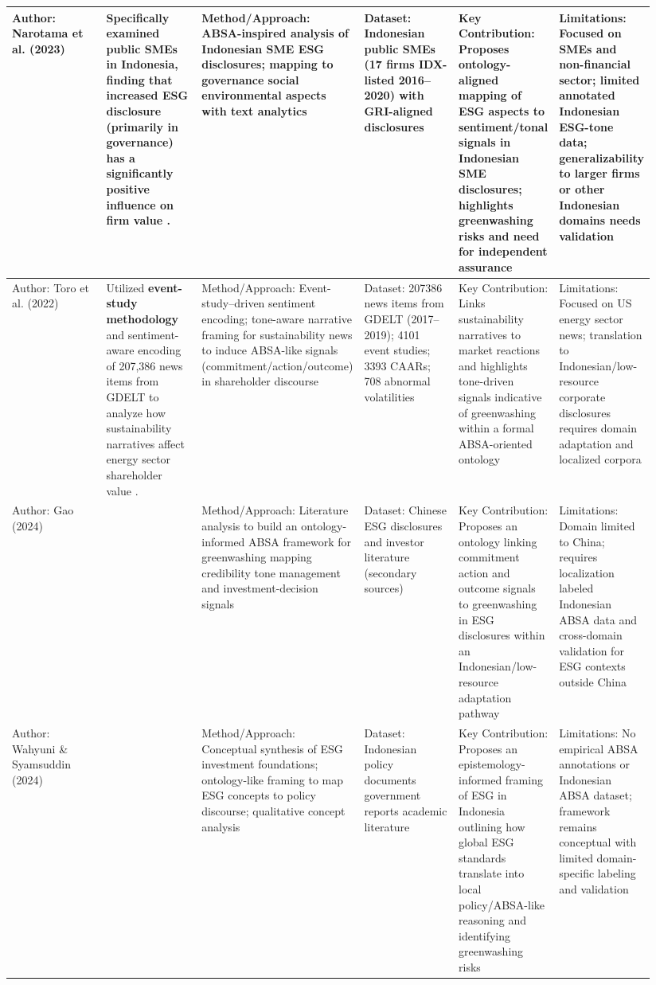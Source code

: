 \documentclass{article}
\begin{document}
\begin{landscape}
\begin{longtable}{p{0.157\linewidth} p{0.157\linewidth} p{0.157\linewidth} p{0.157\linewidth} p{0.157\linewidth} p{0.157\linewidth}}
Author: Narotama et al. (2023) & Specifically examined \textbf{public SMEs in Indonesia}, finding that increased ESG disclosure (primarily in governance) has a significantly positive influence on firm value  \parencite{bintang_narotama_6758c81d}. & Method/Approach: ABSA-inspired analysis of Indonesian SME ESG disclosures; mapping to governance social environmental aspects with text analytics & Dataset: Indonesian public SMEs (17 firms IDX-listed 2016–2020) with GRI-aligned disclosures & Key Contribution: Proposes ontology-aligned mapping of ESG aspects to sentiment/tonal signals in Indonesian SME disclosures; highlights greenwashing risks and need for independent assurance & Limitations: Focused on SMEs and non-financial sector; limited annotated Indonesian ESG-tone data; generalizability to larger firms or other Indonesian domains needs validation \\ \hline
Author: Toro et al. (2022) & Utilized \textbf{event-study methodology} and sentiment-aware encoding of 207,386 news items from GDELT to analyze how sustainability narratives affect energy sector shareholder value  \parencite{alberto_barroso_del_toro_eb0c419a}. & Method/Approach: Event-study–driven sentiment encoding; tone-aware narrative framing for sustainability news to induce ABSA-like signals (commitment/action/outcome) in shareholder discourse & Dataset: 207386 news items from GDELT (2017–2019); 4101 event studies; 3393 CAARs; 708 abnormal volatilities & Key Contribution: Links sustainability narratives to market reactions and highlights tone-driven signals indicative of greenwashing within a formal ABSA-oriented ontology & Limitations: Focused on US energy sector news; translation to Indonesian/low-resource corporate disclosures requires domain adaptation and localized corpora \\ \hline
Author: Gao (2024) & ~ & Method/Approach: Literature analysis to build an ontology-informed ABSA framework for greenwashing mapping credibility tone management and investment-decision signals & Dataset: Chinese ESG disclosures and investor literature (secondary sources) & Key Contribution: Proposes an ontology linking commitment action and outcome signals to greenwashing in ESG disclosures within an Indonesian/low-resource adaptation pathway & Limitations: Domain limited to China; requires localization labeled Indonesian ABSA data and cross-domain validation for ESG contexts outside China \\ \hline
Author: Wahyuni \& Syamsuddin (2024) & ~ & Method/Approach: Conceptual synthesis of ESG investment foundations; ontology-like framing to map ESG concepts to policy discourse; qualitative concept analysis & Dataset: Indonesian policy documents government reports academic literature & Key Contribution: Proposes an epistemology-informed framing of ESG in Indonesia outlining how global ESG standards translate into local policy/ABSA-like reasoning and identifying greenwashing risks & Limitations: No empirical ABSA annotations or Indonesian ABSA dataset; framework remains conceptual with limited domain-specific labeling and validation \\ \hline

\end{longtable}
\end{landscape}
\end{document}
